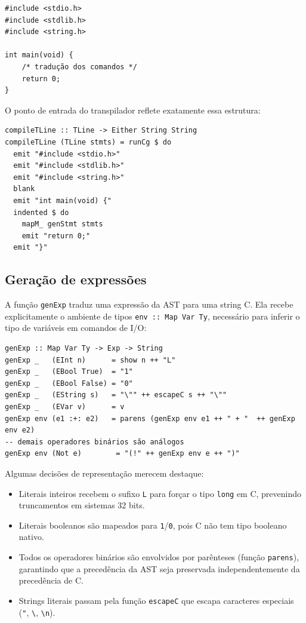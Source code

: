 \begin{verbatim}
#include <stdio.h>
#include <stdlib.h>
#include <string.h>

int main(void) {
    /* tradução dos comandos */
    return 0;
}
\end{verbatim}

O ponto de entrada do transpilador reflete exatamente essa estrutura:

\begin{verbatim}
compileTLine :: TLine -> Either String String
compileTLine (TLine stmts) = runCg $ do
  emit "#include <stdio.h>"
  emit "#include <stdlib.h>"
  emit "#include <string.h>"
  blank
  emit "int main(void) {"
  indented $ do
    mapM_ genStmt stmts
    emit "return 0;"
  emit "}"
\end{verbatim}

\subsection{Geração de expressões}

A função \texttt{genExp} traduz uma expressão da AST para uma string C.
Ela recebe explicitamente o ambiente de tipos \texttt{env :: Map Var Ty},
necessário para inferir o tipo de variáveis em comandos de I/O:

\begin{verbatim}
genExp :: Map Var Ty -> Exp -> String
genExp _   (EInt n)      = show n ++ "L"
genExp _   (EBool True)  = "1"
genExp _   (EBool False) = "0"
genExp _   (EString s)   = "\"" ++ escapeC s ++ "\""
genExp _   (EVar v)      = v
genExp env (e1 :+: e2)   = parens (genExp env e1 ++ " + "  ++ genExp env e2)
-- demais operadores binários são análogos
genExp env (Not e)        = "(!" ++ genExp env e ++ ")"
\end{verbatim}

Algumas decisões de representação merecem destaque:

\begin{itemize}
  \item Literais inteiros recebem o sufixo \texttt{L} para forçar o tipo
    \texttt{long} em C, prevenindo truncamentos em sistemas 32 bits.
  \item Literais booleanos são mapeados para \texttt{1}/\texttt{0}, pois C
    não tem tipo booleano nativo.
  \item Todos os operadores binários são envolvidos por parênteses (função
    \texttt{parens}), garantindo que a precedência da AST seja preservada
    independentemente da precedência de C.
  \item Strings literais passam pela função \texttt{escapeC} que escapa
    caracteres especiais (\texttt{"}, \texttt{\textbackslash}, \texttt{\textbackslash n}).
\end{itemize}

